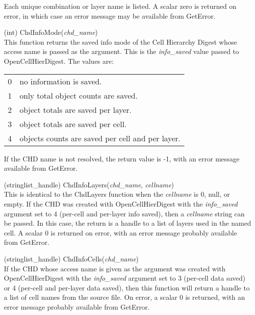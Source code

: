 \begin{description}
Each unique combination or layer name is listed.  A scalar zero is
returned on error, in which case an error message may be available
from {\vt GetError}.

\item{(int) \vt ChdInfoMode({\it chd\_name\/})}\\
This function returns the saved info mode of the Cell Hierarchy Digest
whose access name is passed as the argument.  This is the {\it
info\_saved} value passed to {\vt OpenCellHierDigest}.  The values
are:

\begin{tabular}{ll}
0 & no information is saved.\\
1 & only total object counts are saved.\\
2 & object totals are saved per layer.\\
3 & object totals are saved per cell.\\
4 & objects counts are saved per cell and per layer.\\
\end{tabular}

If the CHD name is not resolved, the return value is -1, with an error
message available from {\vt GetError}.

\item{(stringlist\_handle) \vt ChdInfoLayers({\it chd\_name\/},
 {\it cellname\/})}\\
This is identical to the {\vt ChdLayers} function when the {\it
cellname} is 0, null, or empty.  If the CHD was created with {\vt
OpenCellHierDigest} with the {\it info\_saved} argument set to 4
(per-cell and per-layer info saved), then a {\it cellname} string can
be passed.  In this case, the return is a handle to a list of layers
used in the named cell.  A scalar 0 is returned on error, with an
error message probably available from {\vt GetError}.

\item{(stringlist\_handle) \vt ChdInfoCells({\it chd\_name\/})}\\
If the CHD whose access name is given as the argument was created with
{\vt OpenCellHierDigest} with the {\it info\_saved} argument set to 3
(per-cell data saved) or 4 (per-cell and per-layer data saved), then
this function will return a handle to a list of cell names from the
source file.  On error, a scalar 0 is returned, with an error message
probably available from {\vt GetError}.


\end{description}
